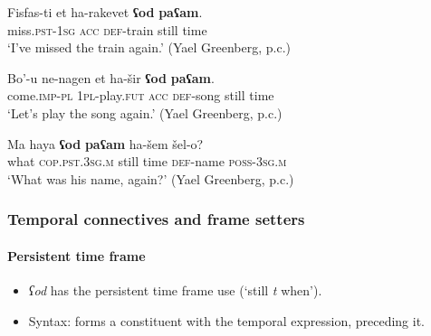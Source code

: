 \begin{exe}
	\ex
	\gll Fisfas-ti et ha-rakevet \textbf{ʕod} \textbf{paʕam}.\\
	miss.\textsc{pst}-1\textsc{sg} \textsc{acc} \textsc{def}-train still time\\
	\glt \lq I've missed the train again.' (Yael Greenberg, p.c.)
	
	\ex
	\gll Bo'-u ne-nagen et ha-šir \textbf{ʕod} \textbf{paʕam}.\\
	come.\textsc{imp}-\textsc{pl} 1\textsc{pl}-play.\textsc{fut} \textsc{acc} \textsc{def}-song still time\\
	\glt \lq Let's play the song again.' (Yael Greenberg, p.c.)
	
	\ex\label{exAppendixHebrewOdIterativeIncrement3}
	\gll Ma haya \textbf{ʕod} \textbf{paʕam} ha-šem šel-o?\\
	what \textsc{cop}.\textsc{pst}.3\textsc{sg}.\textsc{m} still time \textsc{def}-name \textsc{poss}-3\textsc{sg}.\textsc{m}\\
	\glt \lq What was his name, again?' (Yael Greenberg, p.c.)
\end{exe}

\subsubsection{Temporal connectives and frame setters}
\paragraph{Persistent time frame}
\label{appendixHebrewOdContinuativeTT}
\begin{itemize}
	\item \textit{ʕod} has the persistent time frame use (\lq still \textit{t} when\rq{}).
	\item Syntax: forms a constituent with the temporal expression, preceding it.
\end{itemize}
\largerpage

